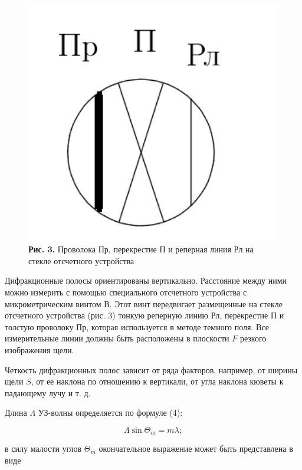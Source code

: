 \documentclass[a4paper,12pt]{article} %
\begin{document}
\begin{figure}
\begin{center}
    \includegraphics[width=1\textwidth]{4.3.2_3.png}
    \textbf{Рис. 3.} Проволока Пр, перекрестие П и реперная линия Рл на стекле отсчетного устройства
\end{center}
\end{figure}

\hfill \break Дифракционные полосы ориентированы вертикально. Расстояние между ними можно измерить с помощью специального отсчетного устройства с микрометрическим  винтом В. Этот винт передвигает размещенные на стекле отсчетного устройства (рис. 3) тонкую реперную линию Рл, перекрестие П и толстую проволоку Пр, которая используется в методе темного поля. Все измерительные линии должны быть расположены в плоскости $F$ резкого изображения щели.

\hfill \break Четкость дифракционных полос зависит от ряда факторов, например, от ширины щели $S$, от ее наклона по отношению к вертикали, от угла наклона кюветы к падающему лучу и т. д.

\hfill \break Длина $\Lambda$ УЗ-волны определяется по формуле (4):

$$
\Lambda \sin{\Theta_{m}} = m\lambda;
$$

\hfill \break в силу малости углов $\Theta_{m}$ окончательное выражение может быть представлена в виде
\end{document}
